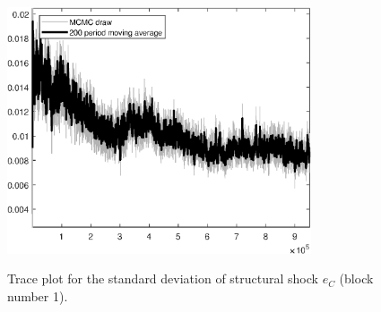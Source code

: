 \begin{figure}[H]
\centering
  \includegraphics[width=0.8\textwidth]{BRS_growth_util_sectoral/graphs/TracePlot_SE_e_C_blck_1}\\
    \caption{Trace plot for the standard deviation of structural shock ${e_C}$ (block number 1).}
\end{figure}
